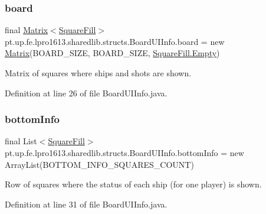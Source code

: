 \subsubsection{\texorpdfstring{board}{board}}
{\footnotesize\ttfamily final \hyperlink{classpt_1_1up_1_1fe_1_1lpro1613_1_1sharedlib_1_1utils_1_1_matrix}{Matrix}$<$\hyperlink{enumpt_1_1up_1_1fe_1_1lpro1613_1_1sharedlib_1_1structs_1_1_board_u_i_info_1_1_square_fill}{Square\+Fill}$>$ pt.\+up.\+fe.\+lpro1613.\+sharedlib.\+structs.\+Board\+U\+I\+Info.\+board = new \hyperlink{classpt_1_1up_1_1fe_1_1lpro1613_1_1sharedlib_1_1utils_1_1_matrix}{Matrix}(B\+O\+A\+R\+D\+\_\+\+S\+I\+ZE, B\+O\+A\+R\+D\+\_\+\+S\+I\+ZE, \hyperlink{enumpt_1_1up_1_1fe_1_1lpro1613_1_1sharedlib_1_1structs_1_1_board_u_i_info_1_1_square_fill_aa0edda009450224fb980df8b8f028717}{Square\+Fill.\+Empty})}

Matrix of squares where ships and shots are shown. 

Definition at line 26 of file Board\+U\+I\+Info.\+java.

\hypertarget{classpt_1_1up_1_1fe_1_1lpro1613_1_1sharedlib_1_1structs_1_1_board_u_i_info_a0f3cbddd3c439328482569c223155d4f}{}\label{classpt_1_1up_1_1fe_1_1lpro1613_1_1sharedlib_1_1structs_1_1_board_u_i_info_a0f3cbddd3c439328482569c223155d4f} 
\subsubsection{\texorpdfstring{bottom\+Info}{bottomInfo}}
{\footnotesize\ttfamily final List$<$\hyperlink{enumpt_1_1up_1_1fe_1_1lpro1613_1_1sharedlib_1_1structs_1_1_board_u_i_info_1_1_square_fill}{Square\+Fill}$>$ pt.\+up.\+fe.\+lpro1613.\+sharedlib.\+structs.\+Board\+U\+I\+Info.\+bottom\+Info = new Array\+List(B\+O\+T\+T\+O\+M\+\_\+\+I\+N\+F\+O\+\_\+\+S\+Q\+U\+A\+R\+E\+S\+\_\+\+C\+O\+U\+NT)}

Row of squares where the status of each ship (for one player) is shown. 

Definition at line 31 of file Board\+U\+I\+Info.\+java.

\hypertarget{classpt_1_1up_1_1fe_1_1lpro1613_1_1sharedlib_1_1structs_1_1_board_u_i_info_ab18de6ba93265ba5e4d4823b905faf59}{}\label{classpt_1_1up_1_1fe_1_1lpro1613_1_1sharedlib_1_1structs_1_1_board_u_i_info_ab18de6ba93265ba5e4d4823b905faf59} 
